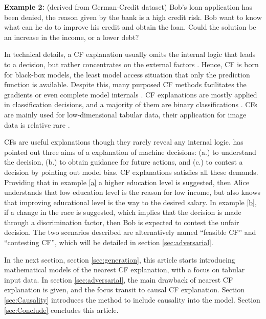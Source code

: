 \noindent \textbf{Example 2:} \label{b}(derived from German-Credit dataset) Bob's loan application has been denied, the reason given by the bank is a high credit risk. Bob want to know what can he do to improve his credit and obtain the loan. Could the solution be an increase in the income, or a lower debt?

In technical details, a CF explanation usually omits the internal logic that leads to a decision, but rather concentrates on the external factors \cite{watcher2017}. Hence, CF is born for black-box models, the least model access situation that only the prediction function is available. Despite this, many purposed CF methods facilitates the gradients or even complete model internals \cite{CFReview}. CF explanations are mostly applied in classification decisions, and a majority of them are binary classifications \cite{CFandAE}. CFs are mainly used for low-dimensional tabular data, their application for image data is relative rare \cite{CFandAE}.

 CFs are useful explanations though they rarely reveal any internal logic. \citeauthor{watcher2017} \cite{watcher2017} has pointed out three aims of a explanation of machine decisions: (a.) to understand the decision, (b.) to obtain guidance for future actions, and (c.) to contest a decision by pointing out model bias. CF explanations satisfies all these demands. Providing that in example \ref{a} a higher education level is suggested, then Alice understands that low education level is the reason for low income, but also knows that improving educational level is the way to the desired salary. In example \ref{b}, if a change in the race is suggested, which implies that the decision is made through a discrimination factor, then Bob is expected to contest the unfair decision. The two scenarios described are alternatively named ``feasible CF'' and ``contesting CF'', which will be detailed in section \ref{sec:adversarial}.

In the next section, section \ref{sec:generation}, this article starts introducing mathematical models of the nearest CF explanation, with a focus on tabular input data. In section \ref{sec:adversarial}, the main drawback of nearest CF explanation is given, and the focus transit to causal CF explanation. Section \ref{sec:Causality} introduces the method to include causality into the model. Section \ref{sec:Conclude} concludes this article.

